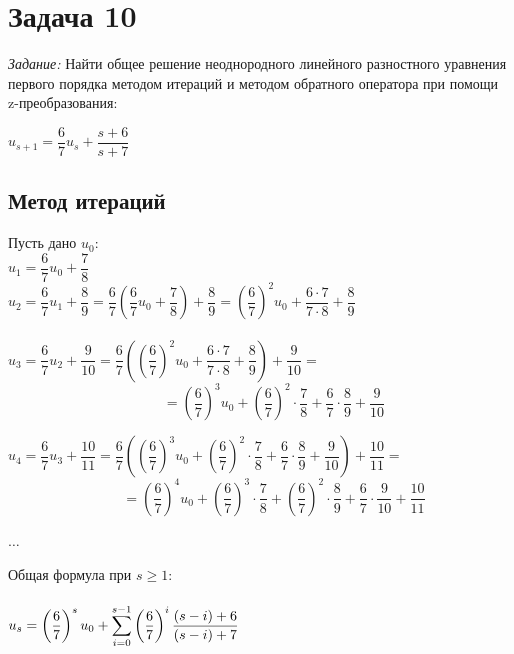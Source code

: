 \documentclass[14pt,fleqn]{extarticle}
\begin{document}
	\newpage
	
	\section*{Задача 10}
	\textit{Задание:} Найти  общее решение неоднородного линейного разностного уравнения первого порядка методом итераций и методом обратного оператора при помощи z-преобразования:
	\begin{center}
		$u_{s+1} = \dfrac{6}{7}u_s + \dfrac{s+6}{s+7}$
	\end{center}
	\subsection*{Метод итераций}
	Пусть дано $u_0$:\\
	
	$u_1 = \dfrac{6}{7}u_0 + \dfrac{7}{8}$\\
	
	$u_2 = \dfrac{6}{7}u_1 + \dfrac{8}{9} = \dfrac{6}{7}\left(\dfrac{6}{7}u_0 + \dfrac{7}{8}\right) + \dfrac{8}{9} = \left(\dfrac{6}{7}\right)^2u_0 + \dfrac{6 \cdot 7}{7 \cdot 8} + \dfrac{8}{9}$\\\\
	
	$u_3 = \dfrac{6}{7}u_2 + \dfrac{9}{10} = \dfrac{6}{7}\left(\left(\dfrac{6}{7}\right)^2u_0 + \dfrac{6 \cdot 7}{7 \cdot 8} + \dfrac{8}{9}\right) + \dfrac{9}{10} =$\\
	\[
		\qquad = \left(\dfrac{6}{7}\right)^3u_0 + \left(\dfrac{6}{7}\right)^2\cdot\dfrac{7}{8} + \dfrac{6}{7}\cdot\dfrac{8}{9} + \dfrac{9}{10}
	\]
	\newline
	
	$u_4 = \dfrac{6}{7}u_3 + \dfrac{10}{11} = \dfrac{6}{7}\left(\left(\dfrac{6}{7}\right)^3u_0 + \left(\dfrac{6}{7}\right)^2\cdot\dfrac{7}{8} + \dfrac{6}{7}\cdot\dfrac{8}{9} + \dfrac{9}{10}\right) + \dfrac{10}{11} =$\\
	\[
		\qquad = \left(\dfrac{6}{7}\right)^4u_0 + \left(\dfrac{6}{7}\right)^3\cdot\dfrac{7}{8} + \left(\dfrac{6}{7}\right)^2\cdot\dfrac{8}{9} + \dfrac{6}{7}\cdot\dfrac{9}{10} + \dfrac{10}{11}
	\]
	
	\begin{center}
		$\ldots$
	\end{center}
	Общая формула при $s \geq 1$:\\\\
	$u_s = \left(\dfrac{6}{7}\right)^su_0 + \smashoperator[r]{\sum_{i=0}^{s-1}} \left(\dfrac{6}{7}\right)^i \dfrac{(s-i) + 6}{(s-i) + 7}$
	\newpage
\end{document}
